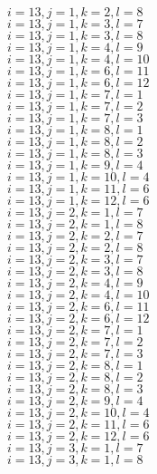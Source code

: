 \documentclass[14pt]{article}
\begin{document}
    $i=13,j=1,k=2,l=8 $ \\ 
    $i=13,j=1,k=3,l=7 $ \\ 
    $i=13,j=1,k=3,l=8 $ \\ 
    $i=13,j=1,k=4,l=9 $ \\ 
    $i=13,j=1,k=4,l=10 $ \\ 
    $i=13,j=1,k=6,l=11 $ \\ 
    $i=13,j=1,k=6,l=12 $ \\ 
    $i=13,j=1,k=7,l=1 $ \\ 
    $i=13,j=1,k=7,l=2 $ \\ 
    $i=13,j=1,k=7,l=3 $ \\ 
    $i=13,j=1,k=8,l=1 $ \\ 
    $i=13,j=1,k=8,l=2 $ \\ 
    $i=13,j=1,k=8,l=3 $ \\ 
    $i=13,j=1,k=9,l=4 $ \\ 
    $i=13,j=1,k=10,l=4 $ \\ 
    $i=13,j=1,k=11,l=6 $ \\ 
    $i=13,j=1,k=12,l=6 $ \\ 
    $i=13,j=2,k=1,l=7 $ \\ 
    $i=13,j=2,k=1,l=8 $ \\ 
    $i=13,j=2,k=2,l=7 $ \\ 
    $i=13,j=2,k=2,l=8 $ \\ 
    $i=13,j=2,k=3,l=7 $ \\ 
    $i=13,j=2,k=3,l=8 $ \\ 
    $i=13,j=2,k=4,l=9 $ \\ 
    $i=13,j=2,k=4,l=10 $ \\ 
    $i=13,j=2,k=6,l=11 $ \\ 
    $i=13,j=2,k=6,l=12 $ \\ 
    $i=13,j=2,k=7,l=1 $ \\ 
    $i=13,j=2,k=7,l=2 $ \\ 
    $i=13,j=2,k=7,l=3 $ \\ 
    $i=13,j=2,k=8,l=1 $ \\ 
    $i=13,j=2,k=8,l=2 $ \\ 
    $i=13,j=2,k=8,l=3 $ \\ 
    $i=13,j=2,k=9,l=4 $ \\ 
    $i=13,j=2,k=10,l=4 $ \\ 
    $i=13,j=2,k=11,l=6 $ \\ 
    $i=13,j=2,k=12,l=6 $ \\ 
    $i=13,j=3,k=1,l=7 $ \\ 
    $i=13,j=3,k=1,l=8 $ \\ 
\end{document}
